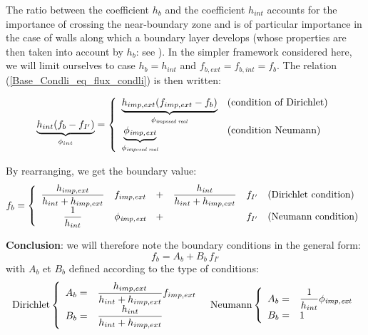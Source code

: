 The ratio between the coefficient $h_{b}$ and the coefficient $h_{int}$ accounts for
the importance of crossing the near-boundary zone and is of particular importance in
the case of walls along which a boundary layer develops (whose properties are then taken
into account by $h_{b}$: see ).
In the simpler framework considered here, we will limit ourselves to
case $h_{b}=h_{int}$ and $f_{b,ext}=f_{b,int}=f_{b}$.
The relation (\ref{Base_Condli_eq_flux_condli}) is then written:

\begin{equation}
\underbrace{h_{int}(f_{b}-f_{I'})}_{\phi_{int}}
  = \left\{\begin{array}{ll}
    \underbrace{h_{imp,ext}(f_{imp,ext}-f_{b})}_{\phi_{\text{\it imposed real}}} &\text{(condition of Dirichlet)}\\
    \underbrace{\phi_{\text{\it imp,ext}}}_{\phi_{\text{\it imposed real}}}
            &\text{(condition  Neumann)}
           \end{array}\right.
\end{equation}

By rearranging, we get the boundary value:
\begin{equation}\label{Base_Condli_eq_fbord_condli}
f_{b}
  = \left\{\begin{array}{cccccl}
    \displaystyle\frac{h_{imp,ext}}{h_{int}+h_{imp,ext}}&f_{imp,ext}&+&
    \displaystyle\frac{h_{int}}{h_{int}+h_{imp,ext}}    &f_{I'}
                         &\text{(Dirichlet condition)}\\
    \displaystyle\frac{1}{h_{int}}&\phi_{\text{\it imp,ext}}&+&
    \ &f_{I'}
            &\text{(Neumann condition)}
           \end{array}\right.
\end{equation}


{\bf Conclusion}: we will therefore note the boundary conditions
in the general form:
\begin{equation}
f_{b}=A_b + B_b\,f_{I'}
\end{equation}
with $A_b$ et $B_b$ defined according to the type of conditions:
\begin{equation}
\begin{array}{c}
\text{Dirichlet}\left\{\begin{array}{ll}
    A_b = &\displaystyle\frac{h_{imp,ext}}{h_{int}+h_{imp,ext}}f_{imp,ext}\\
    B_b = &\displaystyle\frac{h_{int}}{h_{int}+h_{imp,ext}}
                  \end{array}\right.
\text{\ \  Neumann}\left\{\begin{array}{ll}
    A_b = &\displaystyle\frac{1}{h_{int}}\phi_{\text{\it imp,ext}}\\
    B_b = &1
                  \end{array}\right.
\end{array}
\end{equation}

